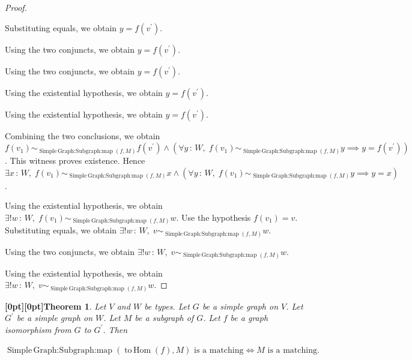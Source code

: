 \documentclass{article}
\makeatletter
\newcommand{\paperanchor}[1]{\hypertarget{#1}{}}%
\def\paperdest{\pdfextension dest}\def\paperstart{\pdfextension startlink}%
\def\paperend{\pdfextension endlink}\def\papercolor{\pdfextension colorstack}%
\let\paperdest\pdfdest\let\paperstart\pdfstartlink\let\paperend\pdfendlink\let\papercolor\pdfcolorstack
\newcommand{\paperanchor}[1]{\paperdest name{#1} xyz}%
\newcommand{\paperanchor}[1]{\special{pdf:dest (#1) [@thispage /XYZ null @ypos null]}}%
\newcommand{\paperlineanchor}[1]{\raisebox{10pt}[0pt][0pt]{\paperanchor{#1}}}
\DeclareRobustCommand{\paperresultname}[1]{\paperlineanchor{theorem:\arabic{theorem}}#1}
\theoremstyle{paperresult}
\newtheorem{theorem}{\paperresultname{Theorem}}
\newenvironment{proofstep}{\par\smallskip\ifdim\leftskip<3em\relax\advance\leftskip by 1em\relax\fi\noindent\ignorespaces}{\par\smallskip}
\makeatother
\begin{document}
\begin{proof}
\begin{proofstep}
\begin{proofstep}
\begin{proofstep}
\begin{proofstep}
\begin{proofstep}
\begin{proofstep}
\begin{proofstep}
\begin{proofstep}
Substituting equals, we obtain \(y = f(v^{'})\).
\end{proofstep}
Using the two conjuncts, we obtain \(y = f(v^{'})\).
\end{proofstep}
Using the two conjuncts, we obtain \(y = f(v^{'})\).
\end{proofstep}
Using the existential hypothesis, we obtain \(y = f(v^{'})\).
\end{proofstep}
Using the existential hypothesis, we obtain \(y = f(v^{'})\).
\end{proofstep}
Combining the two conclusions, we obtain \(f(v_{1}) \sim_{\operatorname{Simple\,Graph\mathord{:}Subgraph\mathord{:}map}(f,\allowbreak{} M)} f(v^{'}) \land (\forall y\, :\, W,\; f(v_{1}) \sim_{\operatorname{Simple\,Graph\mathord{:}Subgraph\mathord{:}map}(f,\allowbreak{} M)} y \implies y = f(v^{'}))\).
This witness proves existence. Hence \(\exists x\, :\, W,\; f(v_{1}) \sim_{\operatorname{Simple\,Graph\mathord{:}Subgraph\mathord{:}map}(f,\allowbreak{} M)} x \land (\forall y\, :\, W,\; f(v_{1}) \sim_{\operatorname{Simple\,Graph\mathord{:}Subgraph\mathord{:}map}(f,\allowbreak{} M)} y \implies y = x)\).
\end{proofstep}
Using the existential hypothesis, we obtain \(\exists! w\, :\, W,\; f(v_{1}) \sim_{\operatorname{Simple\,Graph\mathord{:}Subgraph\mathord{:}map}(f,\allowbreak{} M)} w\).
Use the hypothesis \(f(v_{1}) = v\).
Substituting equals, we obtain \(\exists! w\, :\, W,\; v \sim_{\operatorname{Simple\,Graph\mathord{:}Subgraph\mathord{:}map}(f,\allowbreak{} M)} w\).
\end{proofstep}
Using the two conjuncts, we obtain \(\exists! w\, :\, W,\; v \sim_{\operatorname{Simple\,Graph\mathord{:}Subgraph\mathord{:}map}(f,\allowbreak{} M)} w\).
\end{proofstep}
Using the existential hypothesis, we obtain \(\exists! w\, :\, W,\; v \sim_{\operatorname{Simple\,Graph\mathord{:}Subgraph\mathord{:}map}(f,\allowbreak{} M)} w\).
\end{proof}

\begin{theorem}\label{theorem:15}
Let \(V\) and \(W\) be types. Let \(G\) be a simple graph on \(V\). Let \(G^{'}\) be a simple graph on \(W\). Let \(M\) be a subgraph of \(G\). Let \(f\) be a graph isomorphism from \(G\) to \(G^{'}\). Then
\begin{center}
\(\displaystyle \operatorname{Simple\,Graph\mathord{:}Subgraph\mathord{:}map}(\operatorname{to\,Hom}(f),\allowbreak{} M)\text{ is a matching} \iff M\text{ is a matching}.\)
\end{center}
\end{theorem}
\end{document}
